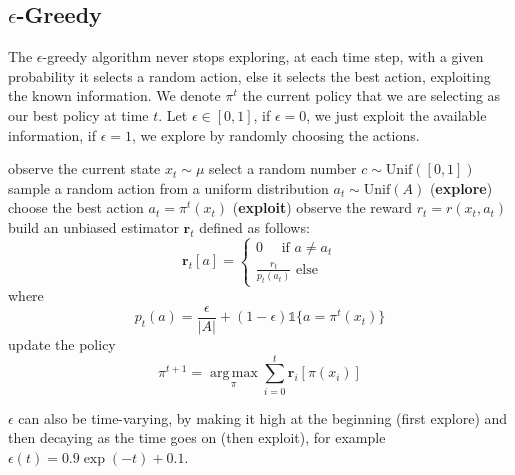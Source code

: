 \documentclass[10pt, a4paper]{report}
\begin{document}
\subsection{$\epsilon$-Greedy}
The $\epsilon$-greedy algorithm never stops exploring, at each time step, with a given probability it selects a random action, else it selects the best action, exploiting the known information. We denote $\pi^t$ the current policy that we are selecting as our best policy at time $t$. Let $\epsilon\in [0,1]$, if $\epsilon=0$, we just exploit the available information, if $\epsilon=1$, we explore by randomly choosing the actions.
\begin{algorithm}[H]
\caption{$\epsilon$-Greedy}\label{alg:eps_greedy_context}
\begin{algorithmic}[1]
\State observe the current state $x_t\sim\mu$
\State select a random number $c\sim \text{Unif}([0,1])$
\State sample a random action from a uniform distribution $a_t\sim\text{Unif}(A)$ (\textbf{explore})
\Else
\State choose the best action $a_t=\pi^t(x_t)$ (\textbf{exploit})
\EndIf
\State observe the reward $r_t=r(x_t,a_t)$
\State build an unbiased estimator $\mathbf r_t$ defined as follows:\begin{equation}\mathbf r_t[a]=\begin{cases}0\quad\text{ if }a\ne a_t\\ \frac{r_t}{p_t(a_t)}\text{ else }\end{cases}\end{equation}where\begin{equation}p_t(a)=\frac{\epsilon}{|A|}+(1-\epsilon)\mathbb 1\{a=\pi^t(x_t)\}\end{equation}
\State update the policy\begin{equation}
    \pi^{t+1}=\operatorname*{arg\,max}_{\pi}\sum_{i=0}^{t}\mathbf r_i[\pi(x_i)]
\end{equation}
\EndFor
\end{algorithmic}
\end{algorithm}
$\epsilon$ can also be time-varying, by making it high at the beginning (first explore) and then decaying as the time goes on (then exploit), for example $\epsilon(t)=0.9\exp(-t)+0.1$.
\end{document}
